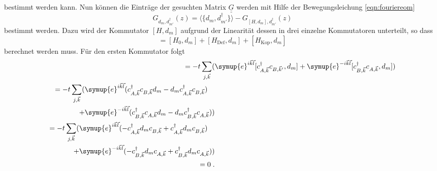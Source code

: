 bestimmt werden kann.
Nun können die Einträge der gesuchten Matrix $\underline{\underline{G}}$ werden mit Hilfe der Bewegungsleichung \eqref{eqn:fouriereom} 
\begin{equation*}
    G_{d_m, d_{m'}^\dagger}(z) = \langle \{ d_m, d_{m'}^\dagger \} \rangle - G_{[H,d_m], d_{m'}^\dagger} (z)
\end{equation*}
bestimmt werden.
Dazu wird der Kommutator $[H,d_m]$ aufgrund der Linearität dessen in drei einzelne Kommutatoren unterteilt, so dass
\begin{equation*}
    [H,d_m] = [H_0,d_m] + [H_\text{Def},d_m] +[H_\text{Kop},d_m] 
\end{equation*}
berechnet werden muss.
Für den ersten Kommutator folgt
\begin{align*}
    [H_0,d_m]   = -t \sum_{j, \vec{k}}(&\symup{e}^{i\vec{k}\vec{l}} [c^\dagger_{A,\vec{k}} c_{B,\vec{k}'}, d_m]
                +\symup{e}^{-i\vec{k}\vec{l}} [c^\dagger_{B,\vec{k}}c_{A,\vec{k}}, d_m] ) \\
                \begin{split}
                        = -t \sum_{j, \vec{k}}(&\symup{e}^{i\vec{k}\vec{l}}(c^\dagger_{A,\vec{k}} c_{B,\vec{k}} d_m
                        -d_m c^\dagger_{A,\vec{k}} c_{B,\vec{k}}) \\ 
                        +&\symup{e}^{-i\vec{k}\vec{l}}(c^\dagger_{B,\vec{k}}c_{A,\vec{k}} d_m
                        -d_m c^\dagger_{B,\vec{k}}c_{A,\vec{k}}))
                \end{split}\\
                \begin{split}
                    = -t \sum_{j, \vec{k}}    (&\symup{e}^{i\vec{k}\vec{l}}(-c^\dagger_{A,\vec{k}} d_m c_{B,\vec{k}}
                    + c^\dagger_{A,\vec{k}} d_m  c_{B,\vec{k}}) \\
                    +&\symup{e}^{-i\vec{k}\vec{l}}(-c^\dagger_{B,\vec{k}} d_m c_{A,\vec{k}}
                    + c^\dagger_{B,\vec{k}} d_m  c_{A,\vec{k}}))
                \end{split}\\ 
                = 0\; \text{.}
\end{align*} \\
